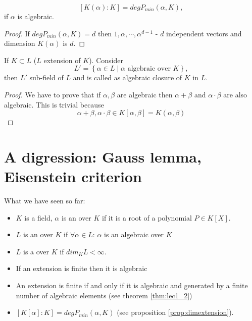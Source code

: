 \begin{proposition}
  \[
  \left[K\left(\alpha\right) : K\right] =
  deg P_{min}\left(\alpha, K\right),
  \]
  if $\alpha$ is algebraic.
  \begin{proof}
    If $deg P_{min}\left(\alpha, K\right) = d$ then $1, \alpha,
    \cdots, \alpha^{d-1}$ - $d$ independent vectors and dimension
    $K\left(\alpha\right)$ is $d$.
  \end{proof}
  \label{prop:dimextension}
\end{proposition}

\begin{proposition}
  If $K \subset L$ ($L$ extension of $K$). Consider
  \[
  L' = \left\{
  \alpha \in L \mid \alpha \mbox{ algebraic over } K
  \right\},
  \]
  then $L'$ sub-field of $L$ and is called as algebraic closure of $K$
  in $L$.
  \begin{proof}
    We have to prove that if $\alpha, \beta$ are algebraic then
    $\alpha + \beta$ and $\alpha \cdot \beta$ are also algebraic. This
    is trivial  because
    \[
    \alpha + \beta, \alpha \cdot \beta \in K\left[\alpha, \beta\right]
    = K\left(\alpha, \beta\right)
    \]
  \end{proof}
\end{proposition}


\section{A digression: Gauss lemma, Eisenstein criterion}

What we have seen so far:

\begin{itemize}
\item $K$ is a field, $\alpha$ is an 
  over $K$ if it is a root of a polynomial $P \in K\left[X\right]$.
\item $L$ is an  over $K$ if
  $\forall \alpha \in L$: $\alpha$ is an algebraic over $K$
\item $L$ is a  over $K$ if $dim_K L <
  \infty$.
\item If an extension is finite then it is algebraic
\item An extension is finite if and only if it is algebraic and
  generated by a finite number of algebraic elements (see theorem
  \ref{thm:lec1_2})
\item $\left[K\left[\alpha\right]:K\right] =
  deg P_{min}\left(\alpha, K\right)$ (see proposition
  \ref{prop:dimextension}). 
\end{itemize}

